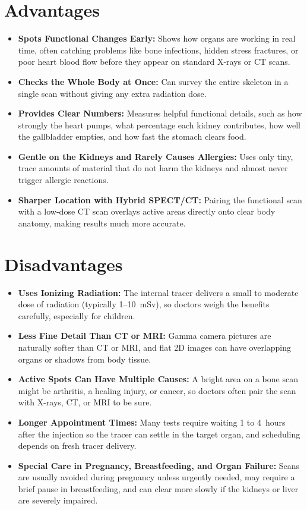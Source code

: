 \section{Advantages}
\begin{itemize}
\item \textbf{Spots Functional Changes Early:} Shows how organs are working in real time, often catching problems like bone infections, hidden stress fractures, or poor heart blood flow before they appear on standard X-rays or CT scans.
\item \textbf{Checks the Whole Body at Once:} Can survey the entire skeleton in a single scan without giving any extra radiation dose.
\item \textbf{Provides Clear Numbers:} Measures helpful functional details, such as how strongly the heart pumps, what percentage each kidney contributes, how well the gallbladder empties, and how fast the stomach clears food.
\item \textbf{Gentle on the Kidneys and Rarely Causes Allergies:} Uses only tiny, trace amounts of material that do not harm the kidneys and almost never trigger allergic reactions.
\item \textbf{Sharper Location with Hybrid SPECT/CT:} Pairing the functional scan with a low-dose CT scan overlays active areas directly onto clear body anatomy, making results much more accurate.
\end{itemize}

\section{Disadvantages}
\begin{itemize}
\item \textbf{Uses Ionizing Radiation:} The internal tracer delivers a small to moderate dose of radiation (typically 1--10~mSv), so doctors weigh the benefits carefully, especially for children.
\item \textbf{Less Fine Detail Than CT or MRI:} Gamma camera pictures are naturally softer than CT or MRI, and flat 2D images can have overlapping organs or shadows from body tissue.
\item \textbf{Active Spots Can Have Multiple Causes:} A bright area on a bone scan might be arthritis, a healing injury, or cancer, so doctors often pair the scan with X-rays, CT, or MRI to be sure.
\item \textbf{Longer Appointment Times:} Many tests require waiting 1 to 4~hours after the injection so the tracer can settle in the target organ, and scheduling depends on fresh tracer delivery.
\item \textbf{Special Care in Pregnancy, Breastfeeding, and Organ Failure:} Scans are usually avoided during pregnancy unless urgently needed, may require a brief pause in breastfeeding, and can clear more slowly if the kidneys or liver are severely impaired.
\end{itemize}

